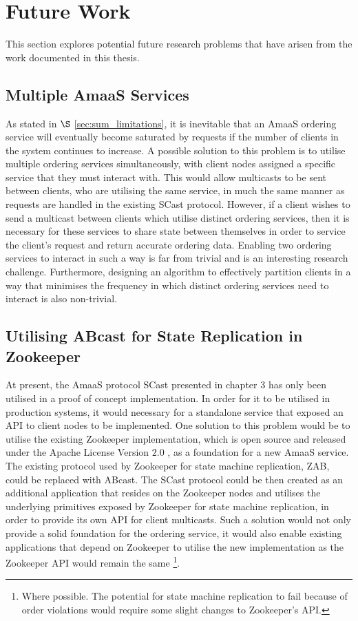 \section{Future Work}
This section explores potential future research problems that have arisen from the work documented in this thesis.

    \subsection{Multiple AmaaS Services}
    As stated in $\S$ \ref{sec:sum_limitations}, it is inevitable that an \textsf{AmaaS} ordering service will eventually become saturated by requests if the number of clients in the system continues to increase.  A possible solution to this problem is to utilise multiple ordering services simultaneously, with client nodes assigned a specific service that they must interact with.  This would allow multicasts to be sent between clients, who are utilising the same service, in much the same manner as requests are handled in the existing \textsf{SCast} protocol.  However, if a client wishes to send a multicast between clients which utilise distinct ordering services, then it is necessary for these services to share state between themselves in order to service the client's request and return accurate ordering data.  Enabling two ordering services to interact in such a way is far from trivial and is an interesting research challenge.  Furthermore, designing an algorithm to effectively partition clients in a way that minimises the frequency in which distinct ordering services need to interact is also non-trivial.  
        
    \subsection{Utilising ABcast for State Replication in Zookeeper}\label{sec:sum_fw_zoo}
    At present, the \textsf{AmaaS} protocol \textsf{SCast} presented in chapter 3 has only been utilised in a proof of concept implementation.  In order for it to be utilised in production systems, it would necessary for a standalone service that exposed an API to client nodes to be implemented.  One solution to this problem would be to utilise the existing Zookeeper implementation, which is open source and released under the Apache License Version $2.0$ \citep{ApacheLicense}, as a foundation for a new \textsf{AmaaS} service.  The existing protocol used by Zookeeper for state machine replication, ZAB, could be replaced with \textsf{ABcast}.  The \textsf{SCast} protocol could be then created as an additional application that resides on the Zookeeper nodes and utilises the underlying primitives exposed by Zookeeper for state machine replication, in order to provide its own API for client multicasts.  Such a solution would not only provide a solid foundation for the ordering service, it would also enable existing applications that depend on Zookeeper to utilise the new implementation as the Zookeeper API would remain the same \footnote{Where possible.  The potential for state machine replication to fail because of order violations would require some slight changes to Zookeeper's API.}.          
        
